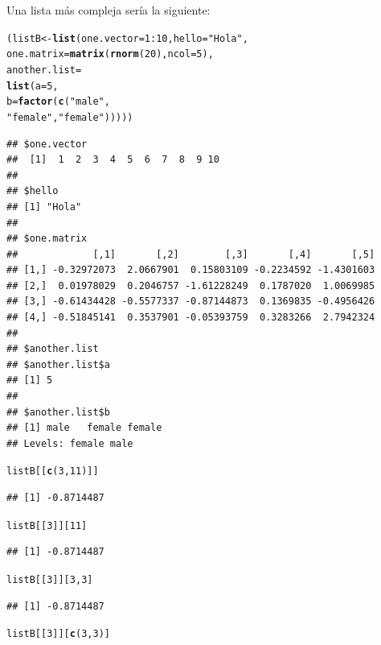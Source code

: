 \documentclass{config/apuntes}\usepackage[]{graphicx}\usepackage[]{xcolor}
\makeatletter
\newcommand{\hlnum}[1]{\textcolor[rgb]{0.686,0.059,0.569}{#1}}%
\newcommand{\hlsng}[1]{\textcolor[rgb]{0.192,0.494,0.8}{#1}}%
\newcommand{\hlopt}[1]{\textcolor[rgb]{0,0,0}{#1}}%
\newcommand{\hldef}[1]{\textcolor[rgb]{0.345,0.345,0.345}{#1}}%
\newcommand{\hlkwb}[1]{\textcolor[rgb]{0.69,0.353,0.396}{#1}}%
\newcommand{\hlkwc}[1]{\textcolor[rgb]{0.333,0.667,0.333}{#1}}%
\newcommand{\hlkwd}[1]{\textcolor[rgb]{0.737,0.353,0.396}{\textbf{#1}}}%
\newenvironment{kframe}{%
 \def\at@end@of@kframe{}%
 \ifinner\ifhmode%
  \def\at@end@of@kframe{\end{minipage}}%
  \begin{minipage}{\columnwidth}%
 \fi\fi%
 \def\FrameCommand##1{\hskip\@totalleftmargin \hskip-\fboxsep
 \colorbox{shadecolor}{##1}\hskip-\fboxsep
     \hskip-\linewidth \hskip-\@totalleftmargin \hskip\columnwidth}%
 \MakeFramed {\advance\hsize-\width
   \@totalleftmargin\z@ \linewidth\hsize
   \@setminipage}}%
 {\par\unskip\endMakeFramed%
 \at@end@of@kframe}
\newenvironment{knitrout}{}{} %
\makeatother
\begin{document}
Una lista más compleja sería la siguiente:
\begin{knitrout}
\color{fgcolor}\begin{kframe}
\begin{alltt}
\hldef{(listB} \hlkwb{<-} \hlkwd{list}\hldef{(}\hlkwc{one.vector} \hldef{=} \hlnum{1}\hlopt{:}\hlnum{10}\hldef{,}  \hlkwc{hello} \hldef{=} \hlsng{"Hola"}\hldef{,}
               \hlkwc{one.matrix} \hldef{=} \hlkwd{matrix}\hldef{(}\hlkwd{rnorm}\hldef{(}\hlnum{20}\hldef{),} \hlkwc{ncol} \hldef{=} \hlnum{5}\hldef{),}
               \hlkwc{another.list} \hldef{=}
               \hlkwd{list}\hldef{(}\hlkwc{a} \hldef{=} \hlnum{5}\hldef{,}
                    \hlkwc{b} \hldef{=} \hlkwd{factor}\hldef{(}\hlkwd{c}\hldef{(}\hlsng{"male"}\hldef{,}
                      \hlsng{"female"}\hldef{,} \hlsng{"female"}\hldef{)))))}
\end{alltt}
\begin{verbatim}
## $one.vector
##  [1]  1  2  3  4  5  6  7  8  9 10
## 
## $hello
## [1] "Hola"
## 
## $one.matrix
##             [,1]       [,2]        [,3]       [,4]       [,5]
## [1,] -0.32972073  2.0667901  0.15803109 -0.2234592 -1.4301603
## [2,]  0.01978029  0.2046757 -1.61228249  0.1787020  1.0069985
## [3,] -0.61434428 -0.5577337 -0.87144873  0.1369835 -0.4956426
## [4,] -0.51845141  0.3537901 -0.05393759  0.3283266  2.7942324
## 
## $another.list
## $another.list$a
## [1] 5
## 
## $another.list$b
## [1] male   female female
## Levels: female male
\end{verbatim}
\begin{alltt}
\hldef{listB[[}\hlkwd{c}\hldef{(}\hlnum{3}\hldef{,} \hlnum{11}\hldef{)]]}
\end{alltt}
\begin{verbatim}
## [1] -0.8714487
\end{verbatim}
\begin{alltt}
\hldef{listB[[}\hlnum{3}\hldef{]][}\hlnum{11}\hldef{]}
\end{alltt}
\begin{verbatim}
## [1] -0.8714487
\end{verbatim}
\begin{alltt}
\hldef{listB[[}\hlnum{3}\hldef{]][}\hlnum{3}\hldef{,} \hlnum{3}\hldef{]}
\end{alltt}
\begin{verbatim}
## [1] -0.8714487
\end{verbatim}
\begin{alltt}
\hldef{listB[[}\hlnum{3}\hldef{]][}\hlkwd{c}\hldef{(}\hlnum{3}\hldef{,} \hlnum{3}\hldef{)]}

\end{alltt}
\end{kframe}
\end{knitrout}
\end{document}
